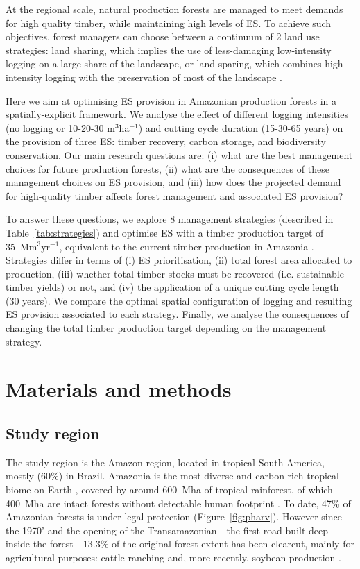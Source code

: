\documentclass{article}
\begin{document}
At the regional scale, natural production forests are managed to meet demands for high quality timber, while maintaining high levels of ES. To achieve such objectives, forest managers can choose between a continuum of 2 land use strategies: land sharing, which implies the use of less-damaging low-intensity logging on a large share of the landscape, or land sparing, which combines high-intensity logging with the preservation of most of the landscape \cite{Green2005}. 

Here we aim at optimising ES provision in Amazonian production forests in a spatially-explicit framework. We analyse the effect of different logging intensities (no logging or 10-20-30 m$^3$ha$^{-1}$) and cutting cycle duration (15-30-65 years) on the provision of three ES: timber recovery, carbon storage, and biodiversity conservation. Our main research questions are: (i) what are the best management choices for future production forests, (ii) what are the consequences of these management choices on ES provision, and (iii) how does the projected demand for high-quality timber affects forest management and associated ES provision? 

To answer these questions, we explore 8 management strategies (described in Table~\ref{tab:strategies}) and optimise ES with a timber production target of 35~Mm$^3$yr$^{-1}$, equivalent to the current timber production in Amazonia \cite{Lentini2005}. Strategies differ in terms of (i) ES prioritisation, (ii) total forest area allocated to production, (iii) whether total timber stocks must be recovered (i.e. sustainable timber yields) or not, and (iv) the application of a unique cutting cycle length (30 years). We compare the optimal spatial configuration of logging and resulting ES provision associated to each strategy. 
Finally, we analyse the consequences of changing the total timber production target depending on the management strategy.

\section{Materials and methods}

\subsection{Study region}

The study region is the Amazon region, located in tropical South America, mostly (60\%) in Brazil. Amazonia is the most diverse and carbon-rich tropical biome on Earth \cite{Avitabile2016,Pimm2014}, covered by around 600~Mha of tropical rainforest, of which 400~Mha are intact forests without detectable human footprint \cite{Potapov2017}. To date, 47\% of Amazonian forests is under legal protection \cite{WDPA2016} (Figure~\ref{fig:pharv}). However since the 1970' and the opening of the Transamazonian - the first road built deep inside the forest - 13.3\% of the original forest extent has been clearcut, mainly for agricultural purposes: cattle ranching and, more recently, soybean production \cite{Fearnside2017}. 
\end{document}
